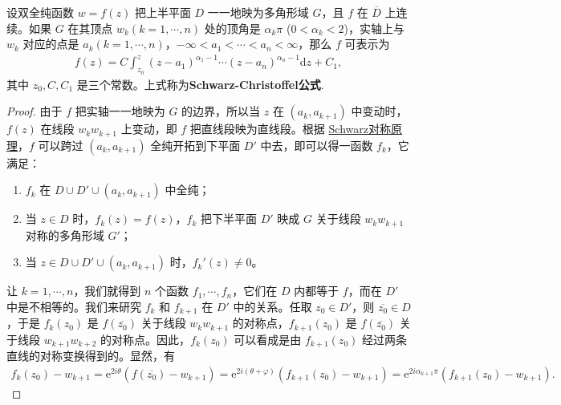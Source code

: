 \documentclass[../../main.tex]{subfiles}%
\begin{document}
\begin{theorem}\label{theorem:Schwarz-Christoffel定理}
设双全纯函数 \(w=f(z)\) 把上半平面 \(D\) 一一地映为多角形域 \(G\)，且 \(f\) 在 \(\overline{D}\) 上连续。如果 \(G\) 在其顶点 \(w_k(k=1,\cdots,n)\) 处的顶角是 \(\alpha_k\pi\) (\(0<\alpha_k<2\))，实轴上与 \(w_k\) 对应的点是 \(a_k(k=1,\cdots,n)\)，\(-\infty < a_1 < \cdots < a_n < \infty\)，那么 \(f\) 可表示为
\begin{align}
f(z) = C \int_{z_0}^{z} (z-a_1)^{\alpha_1-1} \cdots (z-a_n)^{\alpha_n-1} \mathrm{d}z + C_1, \label{eq:Schwarz-Christoffel公式}
\end{align}
其中 \(z_0, C, C_1\) 是三个常数。上式称为\textbf{Schwarz-Christoffel公式}.
\end{theorem}
\begin{proof}
由于 \(f\) 把实轴一一地映为 \(G\) 的边界，所以当 \(z\) 在 \((a_k, a_{k+1})\) 中变动时，\(f(z)\) 在线段 \(w_k w_{k+1}\) 上变动，即 \(f\) 把直线段映为直线段。根据 \hyperref[theorem:双全纯映射的Schwarz对称原理]{Schwarz对称原理}，\(f\) 可以跨过 \((a_k, a_{k+1})\) 全纯开拓到下平面 \(D'\) 中去，即可以得一函数 \(f_k\)，它满足：
\begin{enumerate}[(1)]
\item \(f_k\) 在 \(D \cup D' \cup (a_k, a_{k+1})\) 中全纯；
\item 当 \(z \in D\) 时，\(f_k(z)=f(z)\)，\(f_k\) 把下半平面 \(D'\) 映成 \(G\) 关于线段 \(w_k w_{k+1}\) 对称的多角形域 \(G'\)；
\item 当 \(z \in D \cup D' \cup (a_k, a_{k+1})\) 时，\(f_k'(z) \neq 0\)。
\end{enumerate}
让 \(k=1,\cdots,n\)，我们就得到 \(n\) 个函数 \(f_1,\cdots,f_n\)，它们在 \(D\) 内都等于 \(f\)，而在 \(D'\) 中是不相等的。我们来研究 \(f_k\) 和 \(f_{k+1}\) 在 \(D'\) 中的关系。任取 \(z_0 \in D'\)，则 \(\overline{z_0} \in D\)，于是 \(f_k(z_0)\) 是 \(f(\overline{z_0})\) 关于线段 \(w_k w_{k+1}\) 的对称点，\(f_{k+1}(z_0)\) 是 \(f(\overline{z_0})\) 关于线段 \(w_{k+1} w_{k+2}\) 的对称点。因此，\(f_k(z_0)\) 可以看成是由 \(f_{k+1}(z_0)\) 经过两条直线的对称变换得到的。显然，有
\begin{align*}
f_k(z_0) - w_{k+1} = \mathrm{e}^{2i\theta} (f(\overline{z_0}) - w_{k+1}) = \mathrm{e}^{2i(\theta+\varphi)} (f_{k+1}(z_0) - w_{k+1}) = \mathrm{e}^{2i\alpha_{k+1}\pi} (f_{k+1}(z_0) - w_{k+1}).
\end{align*}


\end{proof}
\end{document}
